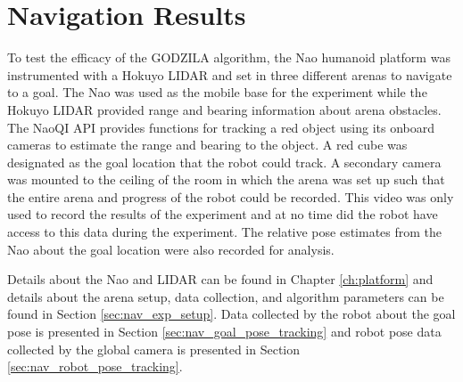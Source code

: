 \chapter{Navigation Results} \label{ch:results_navigation}



To test the efficacy of the GODZILA algorithm, the Nao humanoid platform was instrumented with
a Hokuyo LIDAR and set in three different arenas to navigate to a goal. The Nao was used as the mobile
base for the experiment while the Hokuyo LIDAR provided range and bearing information about
arena obstacles. The NaoQI API provides functions for tracking a red object using its onboard cameras
to estimate the range and bearing to the object. A red cube was designated as the goal location
that the robot could track. 
A secondary camera was mounted to the ceiling of the room in which the
arena was set up such that the entire arena and progress of the robot could be recorded.
This video was only used to record the results of the experiment and at no time did the robot
have access to this data during the experiment. The relative pose estimates from the Nao about
the goal location were also recorded for analysis.

Details about the Nao and LIDAR can be found in Chapter \ref{ch:platform} and details about 
the arena setup, data collection, and algorithm parameters can be found in Section \ref{sec:nav_exp_setup}.
Data collected by the robot about the goal pose is presented in Section \ref{sec:nav_goal_pose_tracking}
and robot pose data collected by the global camera is presented in Section \ref{sec:nav_robot_pose_tracking}.

